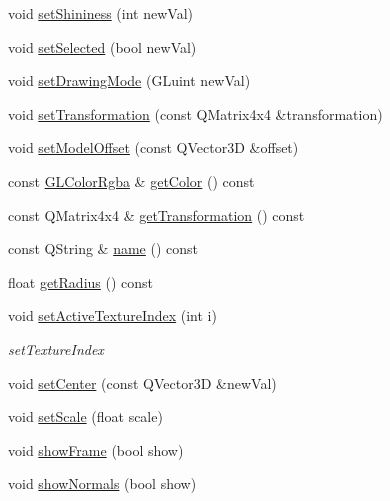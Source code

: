 \begin{DoxyCompactItemize}
\item 
void \mbox{\hyperlink{class_g_l_body_a7f049343daaedfc9672448a8cd4bd3e2}{set\+Shininess}} (int new\+Val)
\item 
void \mbox{\hyperlink{class_g_l_body_a120b454d3d359022d4e74ba58b9b5a7b}{set\+Selected}} (bool new\+Val)
\item 
void \mbox{\hyperlink{class_g_l_body_ad13e6bd35c8796d7cb3ddc69eb87f85f}{set\+Drawing\+Mode}} (G\+Luint new\+Val)
\item 
void \mbox{\hyperlink{class_g_l_body_a3f49f95804f8635125f107e319a38a01}{set\+Transformation}} (const Q\+Matrix4x4 \&transformation)
\item 
void \mbox{\hyperlink{class_g_l_body_a44b1012b09a4b74e4edce7542091b97d}{set\+Model\+Offset}} (const Q\+Vector3D \&offset)
\item 
const \mbox{\hyperlink{class_g_l_color_rgba}{G\+L\+Color\+Rgba}} \& \mbox{\hyperlink{class_g_l_body_aee8dcce60e8a36f49572e83bf0600ee2}{get\+Color}} () const
\item 
const Q\+Matrix4x4 \& \mbox{\hyperlink{class_g_l_body_ab6bd6c800df50d3f41af3a135b94080b}{get\+Transformation}} () const
\item 
const Q\+String \& \mbox{\hyperlink{class_g_l_body_af9f19479127cf12562fa0a2f9b5276f4}{name}} () const
\item 
float \mbox{\hyperlink{class_g_l_body_aed77f06dadb7846e9f1fac0b9a99d482}{get\+Radius}} () const
\item 
void \mbox{\hyperlink{class_g_l_body_a092ff9e6d83c141c41936a7b8cd73033}{set\+Active\+Texture\+Index}} (int i)
\begin{DoxyCompactList}\small\item\em set\+Texture\+Index \end{DoxyCompactList}\item 
void \mbox{\hyperlink{class_g_l_body_abb97f9928110d5bcd47c4488e92ac78e}{set\+Center}} (const Q\+Vector3D \&new\+Val)
\item 
void \mbox{\hyperlink{class_g_l_body_af601d382529e294db3fe7c993fff7a37}{set\+Scale}} (float scale)
\item 
void \mbox{\hyperlink{class_g_l_body_ad7e9267bc3155d72b3623cdf5ecd9595}{show\+Frame}} (bool show)
\item 
void \mbox{\hyperlink{class_g_l_body_acbf8e07de7e749a6e579ecfb683dbc56}{show\+Normals}} (bool show)
\end{DoxyCompactItemize}
